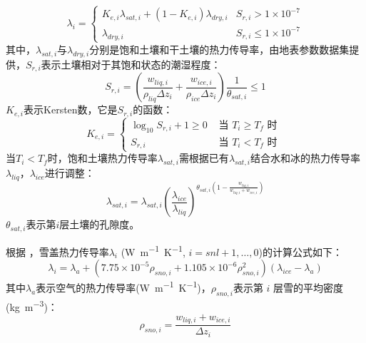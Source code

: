 \begin{equation}
\lambda_{i}=\left\{\begin{array}{ll}K_{e, i} \lambda_{sat, i}+\left(1-K_{e, i}\right) \lambda_{d r y, i} & S_{r, i}>1 \times 10^{-7} \\ \lambda_{d r y, i} & S_{r, i} \leq 1 \times10^{-7}\end{array}\right.
\end{equation}
其中，$\lambda_{sat,i}$与$\lambda_{dry,i}$分别是饱和土壤和干土壤的热力传导率，由地表参数数据集提供，$S_{r,i}$表示土壤相对于其饱和状态的潮湿程度：
\begin{equation}
S_{r, i}=\left(\frac{w_{liq, i}}{\rho_{liq} \Delta z_{i}}+\frac{w_{ice, i}}{\rho_{ice} \Delta z_{i}}\right) \frac{1}{\theta_{sat, i}} \leq 1
\end{equation}
$K_{e,i}$表示Kersten数，它是$S_{r,i}$的函数：
\begin{equation}
K_{e, i}=\left\{\begin{array}{ll}\log _{10} S_{r, i}+1 \geq 0 & \text{ 当 } T_{i} \geq T_{f} \text{ 时 } \\ S_{r, i} & \text{ 当 } T_{i}<T_{f} \text{ 时 }\end{array}\right.
\end{equation}
当$T_i<T_f$时，饱和土壤热力传导率$\lambda_{sat,i}$需根据已有$\lambda_{sat,i}$结合水和冰的热力传导率$\lambda_{liq}$，$\lambda_{ice}$进行调整：
\begin{equation}
\lambda_{sat, i}=\lambda_{sat, i}\left(\frac{\lambda_{ice}}{\lambda_{liq}}\right)^{\theta_{sat, i}\left(1-\frac{w_{liq, i}}{w_{liq, i}+w_{ice, i}}\right)}
\end{equation}
$\theta_{sat, i}$表示第$ i $层土壤的孔隙度。


根据 \citet{jordan1991one}，雪盖热力传导率$\lambda_i$ (\unit{W.m^{-1}.K^{-1}}, $i=snl+1,\ldots,0$)的计算公式如下：
\begin{equation}
\lambda_{i}=\lambda_{a}+\left(7.75 \times 10^{-5} \rho_{sno, i}+1.105 \times 10^{-6} \rho_{sno, i}^{2}\right)\left(\lambda_{ice}-\lambda_{a}\right)
\end{equation}
其中$\lambda_a$表示空气的热力传导率(\unit{W.m^{-1}.K^{-1}})，$\rho_{sno,i}$表示第 $i$ 层雪的平均密度(\unit{kg.m^{-3}})：
\begin{equation}
\rho_{sno, i}=\frac{w_{liq, i}+w_{ice, i}}{\Delta z_{i}}
\end{equation}



